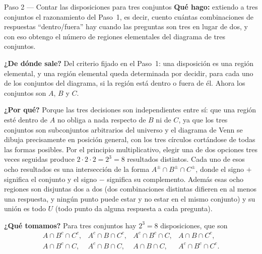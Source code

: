 \documentclass[11pt]{article}
\begin{document}
\begin{paso}{Paso 2 --- Contar las disposiciones para tres conjuntos}
\textbf{Qué hago:} extiendo a tres conjuntos el razonamiento del Paso~1, es decir, cuento
cuántas combinaciones de respuestas ``dentro/fuera'' hay cuando las preguntas son tres en lugar
de dos, y con eso obtengo el número de regiones elementales del diagrama de tres conjuntos.

\textbf{¿De dónde sale?} Del criterio fijado en el Paso~1: una disposición es una región
elemental, y una región elemental queda determinada por decidir, para cada uno de los conjuntos
del diagrama, si la región está dentro o fuera de él. Ahora los conjuntos son $A$, $B$ y $C$.

\textbf{¿Por qué?} Porque las tres decisiones son independientes entre sí: que una región esté
dentro de $A$ no obliga a nada respecto de $B$ ni de $C$, ya que los tres conjuntos son
subconjuntos arbitrarios del universo y el diagrama de Venn se dibuja precisamente en posición
general, con los tres círculos cortándose de todas las formas posibles. Por el principio
multiplicativo, elegir una de dos opciones tres veces seguidas produce $2\cdot 2\cdot 2=2^{3}=8$
resultados distintos. Cada uno de esos ocho resultados es una intersección de la forma
$A^{\pm}\cap B^{\pm}\cap C^{\pm}$, donde el signo $+$ significa el conjunto y el signo $-$
significa su complemento. Además esas ocho regiones son disjuntas dos a dos (dos combinaciones
distintas difieren en al menos una respuesta, y ningún punto puede estar y no estar en el mismo
conjunto) y su unión es todo $U$ (todo punto da alguna respuesta a cada pregunta).

\textbf{¿Qué tomamos?} Para tres conjuntos hay $2^{3}=8$ disposiciones, que son
\[
\begin{array}{llll}
A\cap B^{c}\cap C^{c}, & A^{c}\cap B\cap C^{c}, & A^{c}\cap B^{c}\cap C, & A\cap B\cap C^{c},\\[2pt]
A\cap B^{c}\cap C, & A^{c}\cap B\cap C, & A\cap B\cap C, & A^{c}\cap B^{c}\cap C^{c}.
\end{array}
\]
\end{paso}
\end{document}
